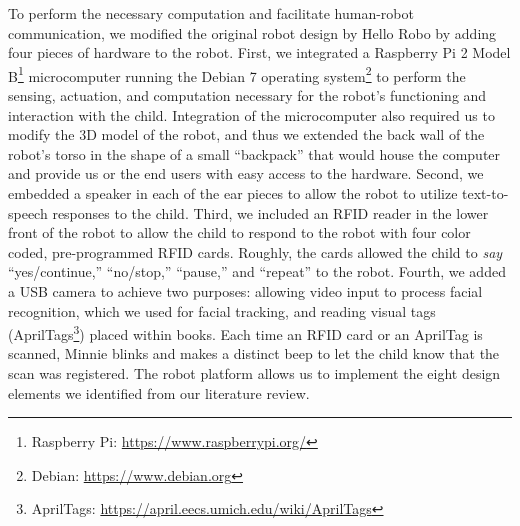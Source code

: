 \documentclass{sigchi}
\begin{document}
To perform the necessary computation and facilitate human-robot communication, we modified the original robot design by Hello Robo by adding four pieces of hardware to the robot. First, we integrated a Raspberry Pi 2 Model B\footnote{Raspberry Pi: \href{https://www.raspberrypi.org/}{https://www.raspberrypi.org/}} microcomputer running the Debian 7 operating system\footnote{Debian: \href{https://www.debian.org}{https://www.debian.org}} to perform the sensing, actuation, and computation necessary for the robot's functioning and interaction with the child. Integration of the microcomputer also required us to modify the 3D model of the robot, and thus we extended the back wall of the robot's torso in the shape of a small ``backpack'' that would house the computer and provide us or the end users with easy access to the hardware. Second, we embedded a speaker in each of the ear pieces to allow the robot to utilize text-to-speech responses to the child. Third, we included an RFID reader in the lower front of the robot to allow the child to respond to the robot with four color coded, pre-programmed RFID cards. Roughly, the cards allowed the child to \textit{say} ``yes/continue,'' ``no/stop,'' ``pause,'' and ``repeat'' to the robot. Fourth, we added a USB camera to achieve two purposes: allowing video input to process facial recognition, which we used for facial tracking, and reading visual tags (AprilTags\footnote{AprilTags: \href{https://april.eecs.umich.edu/wiki/AprilTags}{https://april.eecs.umich.edu/wiki/AprilTags} }) placed within books. Each time an RFID card or an AprilTag is scanned, Minnie blinks and makes a distinct beep to let the child know that the scan was registered. The robot platform allows us to implement the eight design elements we identified from our literature review.
\end{document}

